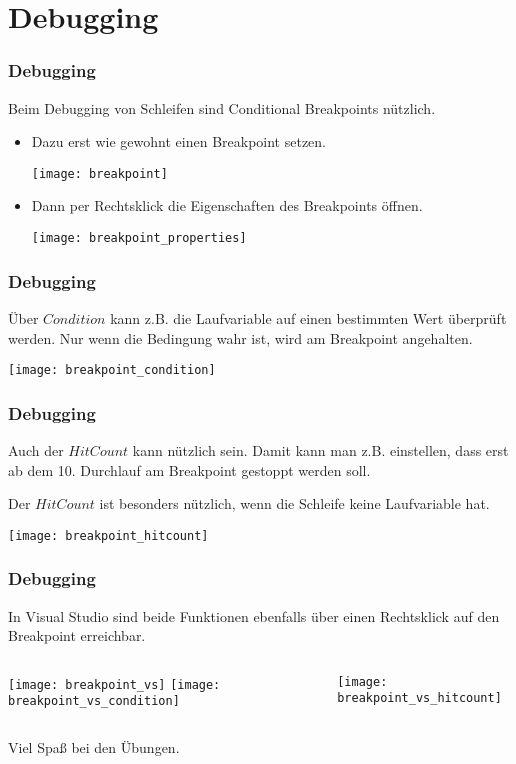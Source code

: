\documentclass[final]{beamer}
\begin{document}
\section{Debugging}
\begin{frame}
  \frametitle{Debugging}
  Beim Debugging von Schleifen sind Conditional Breakpoints nützlich.
  \begin{itemize}
	\item{Dazu erst wie gewohnt einen Breakpoint setzen.

	  \texttt{[image: breakpoint]}
	  }
	\item{Dann per Rechtsklick die Eigenschaften des Breakpoints öffnen.

	  \texttt{[image: breakpoint\_properties]}
	  }
  \end{itemize}
\end{frame}
\begin{frame}
  \frametitle{Debugging}
  Über $Condition$ kann z.B. die Laufvariable auf einen bestimmten Wert überprüft
  werden. Nur wenn die Bedingung wahr ist, wird am Breakpoint angehalten.

  \begin{center}
  \texttt{[image: breakpoint\_condition]}
  \end{center}
\end{frame}
\begin{frame}
  \frametitle{Debugging}
  Auch der $Hit Count$ kann nützlich sein. Damit kann man z.B. einstellen, dass erst
  ab dem 10. Durchlauf am Breakpoint gestoppt werden soll.

  Der $Hit Count$ ist besonders nützlich, wenn die Schleife keine Laufvariable hat.

  \begin{center}
  \texttt{[image: breakpoint\_hitcount]}
  \end{center}
\end{frame}
\begin{frame}
  \frametitle{Debugging}
  In Visual Studio sind beide Funktionen ebenfalls über einen Rechtsklick auf den Breakpoint
  erreichbar.

  \begin{columns}[T]
	\texttt{[image: breakpoint\_vs]}
	\texttt{[image: breakpoint\_vs\_condition]}

	\texttt{[image: breakpoint\_vs\_hitcount]}
  \end{columns}
\end{frame}

\begin{frame}
  \begin{center}
	\vfill
	\Huge{Viel Spaß bei den Übungen.}
	\vfill
  \end{center}
\end{frame}
\end{document}
